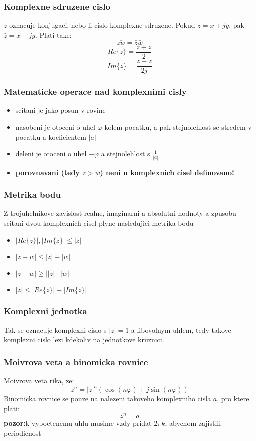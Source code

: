 \subsubsection*{Komplexne sdruzene cislo}
$\bar{z}$ oznacuje konjugaci, nebo-li cislo komplexne sdruzene. Pokud $z=x+jy$, pak $\bar{z}=x-jy$. Plati take:
$$\overline{zw}=\bar{z}\bar{w}$$
$$Re\{z\} = \frac{z+\bar{z}}{2}$$
$$Im\{z\} = \frac{z-\bar{z}}{2j}$$

\subsubsection*{Matematicke operace nad komplexnimi cisly}
\begin{itemize}
\item scitani je jako posun v rovine
\item nasobeni je otoceni o uhel $\varphi$ kolem pocatku, a pak stejnolehlost se stredem v pocatku a koeficientem $|a|$
\item deleni je otoceni o uhel $-\varphi$ a stejnolehlost s $\frac{1}{|a|}$
\item \textbf{porovnavani (tedy $z>w$) neni u komplexnich cisel definovano!}
\end{itemize}

\subsubsection*{Metrika bodu}
Z trojuhelnikove zavislost realne, imaginarni a absolutni hodnoty a zpusobu scitani dvou komplexnich cisel plyne nasledujici metrika bodu 
\begin{itemize}
\item $|Re\{z\}|,|Im\{z\}| \leq |z|$
\item $|z+w| \leq |z| + |w|$
\item $|z+w| \geq ||z|-|w||$
\item $|z| \leq |Re\{z\}|+|Im\{z\}|$
\end{itemize}

\subsubsection{Komplexni jednotka}
Tak se oznacuje komplexni cislo s $|z|=1$ a libovolnym uhlem, tedy takove komplexni cislo lezi kdekoliv na jednotkove kruznici.

\subsubsection*{Moivrova veta a binomicka rovnice}
Moivrova veta rika, ze:
\begin{equation}
\label{eq:moivrova}
z^n = |z|^n (\operatorname{cos}(n\varphi)+j\operatorname{sin}(n\varphi))
\end{equation}
Binomicka rovnice se pouze na nalezeni takoveho komplexniho cisla $a$, pro ktere plati:
\begin{equation}
\label{eq:binomicka}
z^n = a
\end{equation}
\textbf{pozor:}k vypoctenemu uhlu musime vzdy pridat $2\pi k$, abychom zajistili periodicnost

